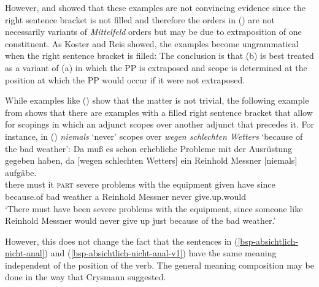   However, \citet[Section~6]{Koster75a} and \citet*[]{Reis80a} showed that these examples
  are not convincing evidence since the right sentence bracket is not filled and therefore the
  orders in () are not necessarily variants of \emph{Mittelfeld} orders but may be due to extraposition of
  one constituent. As Koster and Reis showed, the examples become ungrammatical when the right sentence
  bracket is filled:
\eal
{}
\zl
The conclusion is that (b) is best treated as a variant of (a) in which the PP is
extraposed and scope is determined at the position at which the PP would occur if it were not extraposed.

While examples like () show that the matter is not trivial, the following example from \citet[]{Crysmann2004a} shows that there are examples with a filled right sentence bracket that allow
for scopings in which an adjunct scopes over another adjunct that precedes it. For instance, in
() \emph{niemals} `never' scopes over \emph{wegen schlechten Wetters} `because of the bad weather':
\ea
\gll Da muß es schon erhebliche Probleme mit der Ausrüstung gegeben haben, da [wegen
  schlechten  Wetters] ein Reinhold Messner [niemals] aufgäbe.\\
     there must it \textsc{part} severe problems with the equipment given have since \hphantom{[}because.of bad weather a Reinhold Messner \hphantom{[}never give.up.would\\
\glt `There must have been severe problems with the equipment, since someone like Reinhold Messner
would never give up just because of the bad weather.'
\z

\noindent
However, this does not change the fact that the sentences in (\ref{bsp-absichtlich-nicht-anal}) and
(\ref{bsp-absichtlich-nicht-anal-v1}) have the same meaning independent of the position of the
verb. The general meaning composition may be done in the way that Crysmann suggested.%
%

